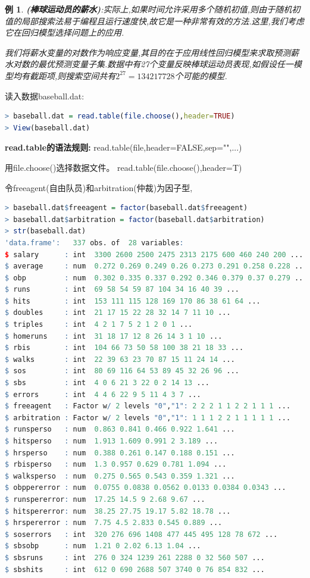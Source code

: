 \documentclass[11pt,a4paper,oneside]{book}
\newtheorem{example}{例}
\begin{document}
\begin{example}
\textbf{(棒球运动员的薪水)}:实际上,如果时间允许采用多个随机初值,则由于随机初值的局部搜索法易于编程且运行速度快,故它是一种非常有效的方法.这里,我们考虑它在回归模型选择问题上的应用.

我们将薪水变量的对数作为响应变量,其目的在于应用线性回归模型来求取预测薪水对数的最优预测变量子集.数据中有27个变量反映棒球运动员表现,如假设任一模型均有截距项,则搜索空间共有$ 2^{27}=134217728 $个可能的模型.
\end{example}

读入数据baseball.dat:
\begin{lstlisting}[language=r]
> baseball.dat = read.table(file.choose(),header=TRUE)
> View(baseball.dat)
\end{lstlisting}
\begin{tcolorbox}[colback=pink!10!white,colframe=pink!100!black]
\textbf{read.table的语法规则:}
read.table(file,header=FALSE,sep="",...)

用file.choose()选择数据文件。
read.table(file.choose(),header=T)
\end{tcolorbox}
令freeagent(自由队员)和arbitration(仲裁)为因子型,
\begin{lstlisting}[language=r]
> baseball.dat$freeagent = factor(baseball.dat$freeagent)
> baseball.dat$arbitration = factor(baseball.dat$arbitration)
> str(baseball.dat)
'data.frame':	337 obs. of  28 variables:
$ salary      : int  3300 2600 2500 2475 2313 2175 600 460 240 200 ...
$ average     : num  0.272 0.269 0.249 0.26 0.273 0.291 0.258 0.228 ...
$ obp         : num  0.302 0.335 0.337 0.292 0.346 0.379 0.37 0.279 ...
$ runs        : int  69 58 54 59 87 104 34 16 40 39 ...
$ hits        : int  153 111 115 128 169 170 86 38 61 64 ...
$ doubles     : int  21 17 15 22 28 32 14 7 11 10 ...
$ triples     : int  4 2 1 7 5 2 1 2 0 1 ...
$ homeruns    : int  31 18 17 12 8 26 14 3 1 10 ...
$ rbis        : int  104 66 73 50 58 100 38 21 18 33 ...
$ walks       : int  22 39 63 23 70 87 15 11 24 14 ...
$ sos         : int  80 69 116 64 53 89 45 32 26 96 ...
$ sbs         : int  4 0 6 21 3 22 0 2 14 13 ...
$ errors      : int  4 4 6 22 9 5 11 4 3 7 ...
$ freeagent   : Factor w/ 2 levels "0","1": 2 2 2 1 1 2 2 1 1 1 ...
$ arbitration : Factor w/ 2 levels "0","1": 1 1 1 2 2 1 1 1 1 1 ...
$ runsperso   : num  0.863 0.841 0.466 0.922 1.641 ...
$ hitsperso   : num  1.913 1.609 0.991 2 3.189 ...
$ hrsperso    : num  0.388 0.261 0.147 0.188 0.151 ...
$ rbisperso   : num  1.3 0.957 0.629 0.781 1.094 ...
$ walksperso  : num  0.275 0.565 0.543 0.359 1.321 ...
$ obppererror : num  0.0755 0.0838 0.0562 0.0133 0.0384 0.0343 ...
$ runspererror: num  17.25 14.5 9 2.68 9.67 ...
$ hitspererror: num  38.25 27.75 19.17 5.82 18.78 ...
$ hrspererror : num  7.75 4.5 2.833 0.545 0.889 ...
$ soserrors   : int  320 276 696 1408 477 445 495 128 78 672 ...
$ sbsobp      : num  1.21 0 2.02 6.13 1.04 ...
$ sbsruns     : int  276 0 324 1239 261 2288 0 32 560 507 ...
$ sbshits     : int  612 0 690 2688 507 3740 0 76 854 832 ...
\end{lstlisting}
\end{document}
